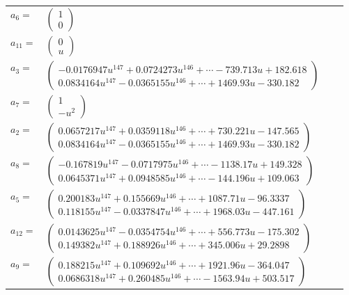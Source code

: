 \documentclass[1p]{elsarticle_modified}
\theoremstyle{definition}
\begin{document}
\begin{tabular}{m{7pt} m{180pt} m{7pt} m{180pt} }
\flushright $a_{6}=$&$\begin{pmatrix}1\\0\end{pmatrix}$ \\
\flushright $a_{11}=$&$\begin{pmatrix}0\\u\end{pmatrix}$ \\
\flushright $a_{3}=$&$\begin{pmatrix}-0.0176947 u^{147}+0.0724273 u^{146}+\cdots-739.713 u+182.618\\0.0834164 u^{147}-0.0365155 u^{146}+\cdots+1469.93 u-330.182\end{pmatrix}$ \\
\flushright $a_{7}=$&$\begin{pmatrix}1\\- u^2\end{pmatrix}$ \\
\flushright $a_{2}=$&$\begin{pmatrix}0.0657217 u^{147}+0.0359118 u^{146}+\cdots+730.221 u-147.565\\0.0834164 u^{147}-0.0365155 u^{146}+\cdots+1469.93 u-330.182\end{pmatrix}$ \\
\flushright $a_{8}=$&$\begin{pmatrix}-0.167819 u^{147}-0.0717975 u^{146}+\cdots-1138.17 u+149.328\\0.0645371 u^{147}+0.0948585 u^{146}+\cdots-144.196 u+109.063\end{pmatrix}$ \\
\flushright $a_{5}=$&$\begin{pmatrix}0.200183 u^{147}+0.155669 u^{146}+\cdots+1087.71 u-96.3337\\0.118155 u^{147}-0.0337847 u^{146}+\cdots+1968.03 u-447.161\end{pmatrix}$ \\
\flushright $a_{12}=$&$\begin{pmatrix}0.0143625 u^{147}-0.0354754 u^{146}+\cdots+556.773 u-175.302\\0.149382 u^{147}+0.188926 u^{146}+\cdots+345.006 u+29.2898\end{pmatrix}$ \\
\flushright $a_{9}=$&$\begin{pmatrix}0.188215 u^{147}+0.109692 u^{146}+\cdots+1921.96 u-364.047\\0.0686318 u^{147}+0.260485 u^{146}+\cdots-1563.94 u+503.517\end{pmatrix}$ \\

\end{tabular}
\end{document}
